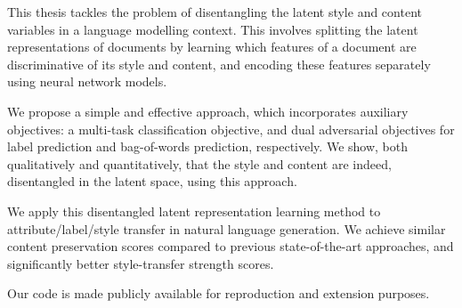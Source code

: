 This thesis tackles the problem of disentangling the latent style and content variables in a language modelling context. This involves splitting the latent representations of documents by learning which features of a document are discriminative of its style and content, and encoding these features separately using neural network models.

We propose a simple and effective approach, which incorporates auxiliary objectives: a multi-task classification objective, and dual adversarial objectives for label prediction and bag-of-words prediction, respectively. We show, both qualitatively and quantitatively, that the style and content are indeed, disentangled in the latent space, using this approach.

We apply this disentangled latent representation learning method to attribute/label/style transfer in natural language generation. We achieve similar content preservation scores compared to previous state-of-the-art approaches, and significantly better style-transfer strength scores.

Our code is made publicly available for reproduction and extension purposes.
